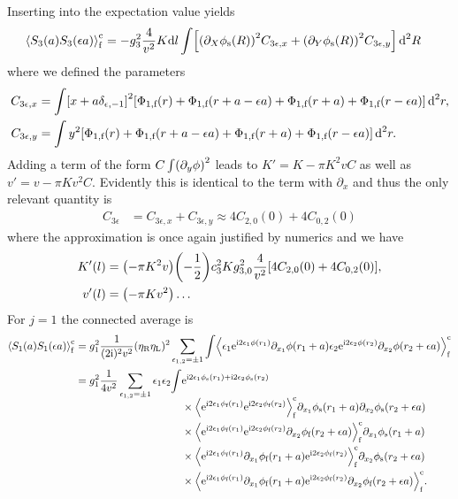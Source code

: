 \documentclass[english, parskip=full]{scrartcl}
\begin{document}
Inserting into the expectation value yields
\begin{align}
\bra*{S_3(a) S_3(\epsilon a)}_\f^\c &= -g_3^2 \frac{4}{v^2} K\d l \int \klb*{\kla*{\partial_X\phi_\s(R)}^2 C_{3\epsilon,x} + \kla*{\partial_Y\phi_\s(R)}^2 C_{3\epsilon,y}} \,\d^2R
\end{align}
where we defined the parameters
\begin{align}
C_{3\epsilon,x} &= \int \klb*{x + a\delta_{\epsilon,-1}}^2  \klb*{\Phi_{1,\f}(r) + \Phi_{1,\f}(r+a-\epsilon a) + \Phi_{1,\f}(r+a) + \Phi_{1,\f}(r-\epsilon a)}\,\d^2r,\\
C_{3\epsilon,y} &= \int y^2 \klb*{\Phi_{1,\f}(r) + \Phi_{1,\f}(r+a-\epsilon a) + \Phi_{1,\f}(r+a) + \Phi_{1,\f}(r-\epsilon a)}\,\d^2r.
\end{align}
Adding a term of the form $C\int \kla*{\partial_y\phi}^2$ leads to $K'=K-\pi K^2vC$ as well as $v'=v-\pi Kv^2C$.
Evidently this is identical to the term with $\partial_x$ and thus the only relevant quantity is
\begin{align}
C_{3\epsilon} &= C_{3\epsilon,x} + C_{3\epsilon,y} \approx 4C_{2,0}(0) + 4C_{0,2}(0)
\end{align}
where the approximation is once again justified by numerics and we have
\begin{align}
K'(l) &= \kla*{-\pi K^2v} \kla*{-\frac{1}{2}} c_3^2 K g_{3,0}^2 \frac{4}{v^2} \klb*{4C_{2,0}(0) + 4C_{0,2}(0)},\\
v'(l) &= \kla*{-\pi Kv^2} \dots
\end{align}
For $j=1$ the connected average is
\begin{align}
\bra*{S_1(a) S_1(\epsilon a)}_\f^\c &= g_1^2 \frac{1}{(2\i)^2v^2} (\eta_\R\eta_\L)^2 \sum_{\epsilon_{1,2}=\pm 1} \int \bra*{ \epsilon_1 \powe{\i 2\epsilon_1\phi(r_1)} \partial_{x_1} \phi(r_1+a) \epsilon_2 \powe{\i 2\epsilon_2\phi(r_2)} \partial_{x_2} \phi(r_2+\epsilon a)}_\f^\c\\
&= g_1^2\frac{1}{4v^2} \sum_{\epsilon_{1,2}=\pm 1} \epsilon_1\epsilon_2 \bsplit{\int & \powe{\i 2\epsilon_1\phi_\s(r_1) + \i 2\epsilon_2\phi_\s(r_2)}\\
&\times \bra*{\powe{\i 2\epsilon_1\phi_\f(r_1)} \powe{\i 2\epsilon_2\phi_\f(r_2)}}_\f^\c \partial_{x_1} \phi_\s(r_1+ a) \partial_{x_2} \phi_\s(r_2+\epsilon a)\\
&\times \bra*{\powe{\i 2\epsilon_1\phi_\f(r_1)} \powe{\i 2\epsilon_2\phi_\f(r_2)} \partial_{x_2} \phi_\f(r_2+\epsilon a)}_\f^\c \partial_{x_1} \phi_\s(r_1+ a)\\
&\times \bra*{\powe{\i 2\epsilon_1\phi_\f(r_1)} \partial_{x_1} \phi_\f(r_1+ a) \powe{\i 2\epsilon_2\phi_\f(r_2)}}_\f^\c \partial_{x_2} \phi_\s(r_2+\epsilon a)\\
&\times \bra*{\powe{\i 2\epsilon_1\phi_\f(r_1)} \partial_{x_1} \phi_\f(r_1+ a) \powe{\i 2\epsilon_2\phi_\f(r_2)} \partial_{x_2} \phi_\f(r_2+\epsilon a)}_\f^\c.}
\end{align}
\end{document}
